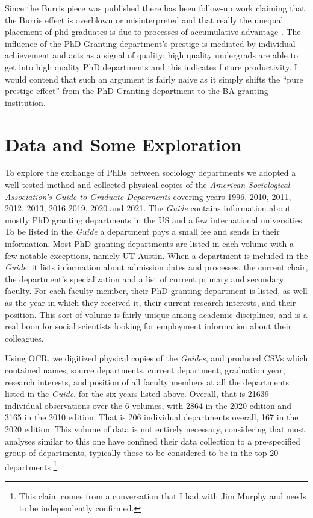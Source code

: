 \documentclass{article}
\begin{document}
Since the Burris piece was published there has been follow-up work claiming that the Burris effect is overblown or misinterpreted and that really the unequal placement of phd graduates is due to processes of accumulative advantage \cite{headworth_credential_2016}. The influence of the PhD Granting department's prestige is mediated by individual achievement and acts as a signal of quality; high quality undergrads are able to get into high quality PhD departments and this indicates future productivity. I would contend that such an argument is fairly naive as it simply shifts the ``pure prestige effect'' from the PhD Granting department to the BA granting institution.

\section{Data and Some Exploration}

To explore the exchange of PhDs between sociology departments we adopted a well-tested method and collected physical copies of the \emph{American Sociological Association's Guide to Graduate Deparments} covering years 1996, 2010, 2011, 2012, 2013, 2016 2019, 2020 and 2021. The \emph{Guide} contains information about mostly PhD granting departments in the US and a few international universities. To be listed in the \emph{Guide} a department pays a small fee and sends in their information. Most PhD granting departments are listed in each volume with a few notable exceptions, namely UT-Austin. When a department is included in the \emph{Guide}, it lists information about admission dates and processes, the current chair, the department's specialization and a list of current primary and secondary faculty. For each faculty member, their PhD granting department is listed, as well as the year in which they received it, their current research interests, and their position. This sort of volume is fairly unique among academic disciplines, and is a real boon for social scientists looking for employment information about their colleagues.

Using OCR, we digitized physical copies of the \emph{Guides}, and produced CSVs which contained names, source departments, current department, graduation year, research interests, and position of all faculty members at all the departments listed in the \emph{Guide}. for the six years listed above. Overall, that is 21639 individual observations over the 6 volumes, with 2864 in the 2020 edition and 3165 in the 2010 edition. That is 206 individual departments overall, 167 in the 2020 edition. This volume of data is not entirely necessary, considering that most analyses similar to this one have confined their data collection to a pre-specified group of departments, typically those to be considered to be in the top 20 departments \footnote{This claim comes from a conversation that I had with Jim Murphy and needs to be independently confirmed.}.
\end{document}
